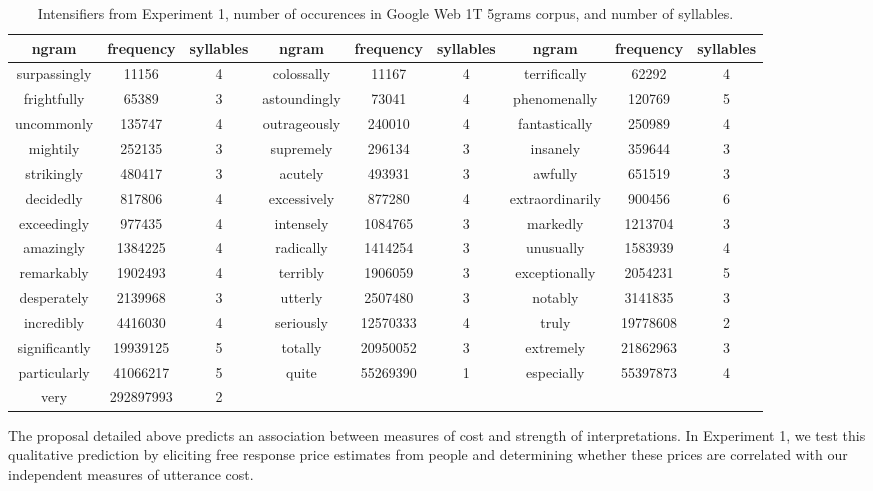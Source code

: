 \documentclass[10pt,letterpaper]{article}
\begin{document}
\begin{table}[htb]
 \begin{center}
 \footnotesize
  \caption{Intensifiers from Experiment 1, number of occurences in Google Web 1T 5grams corpus, and number of syllables.}
  \label{exp1-intensifiers}
  \begin{tabular}{ccc|ccc|ccc}
   \hline
   ngram & frequency & syllables &
   ngram & frequency & syllables &
   ngram & frequency & syllables \\
    \hline
    surpassingly & 11156 & 4 &
    colossally & 11167 & 4 &
    terrifically & 62292 & 4 \\
    frightfully & 65389 & 3 &
    astoundingly & 73041 & 4 &
    phenomenally & 120769 & 5 \\
    uncommonly & 135747 & 4 &
    outrageously & 240010 & 4 &
    fantastically & 250989 & 4 \\
    mightily & 252135 & 3 &
    supremely & 296134 & 3 &
    insanely & 359644 & 3 \\
    strikingly & 480417 & 3 &
    acutely & 493931 & 3 &
    awfully & 651519 & 3 \\
    decidedly & 817806 & 4 &
    excessively & 877280 & 4 &
    extraordinarily & 900456 & 6 \\
    exceedingly & 977435 & 4 &
    intensely & 1084765 & 3 &
    markedly & 1213704 & 3 \\
    amazingly & 1384225 & 4 &
    radically & 1414254 & 3 &
    unusually & 1583939 & 4 \\
    remarkably & 1902493 & 4 &
    terribly & 1906059 & 3 &
    exceptionally & 2054231 & 5 \\
    desperately & 2139968 & 3 &
    utterly & 2507480 & 3 &
    notably & 3141835 & 3 \\
    incredibly & 4416030 & 4 &
    seriously & 12570333 & 4 &
    truly & 19778608 & 2 \\
    significantly & 19939125 & 5 &
    totally & 20950052 & 3 &
    extremely & 21862963 & 3 \\
    particularly & 41066217 & 5 &
    quite & 55269390 & 1 &
    especially & 55397873 & 4 \\
    very & 292897993 & 2
  \end{tabular}
 \end{center}
\end{table}

The proposal detailed above predicts an association between measures of cost and strength of interpretations. In Experiment 1, we test this qualitative prediction
by eliciting free response price estimates from people and determining whether these prices are correlated with our independent measures of utterance cost.
\end{document}
